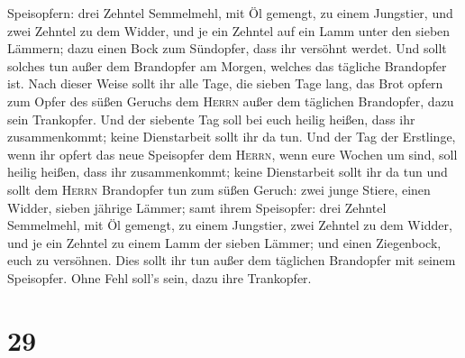 Speisopfern: drei Zehntel Semmelmehl, mit Öl gemengt, zu einem
Jungstier, und zwei Zehntel zu dem Widder,  und je ein
Zehntel auf ein Lamm unter den sieben Lämmern;  dazu
einen Bock zum Sündopfer, dass ihr versöhnt werdet.  Und
sollt solches tun außer dem Brandopfer am Morgen, welches das tägliche
Brandopfer ist.  Nach dieser Weise sollt ihr alle Tage,
die sieben Tage lang, das Brot opfern zum Opfer des süßen Geruchs dem
\textsc{Herrn} außer dem täglichen Brandopfer, dazu sein Trankopfer.
 Und der siebente Tag soll bei euch heilig heißen, dass
ihr zusammenkommt; keine Dienstarbeit sollt ihr da tun. 
Und der Tag der Erstlinge, wenn ihr opfert das neue Speisopfer dem
\textsc{Herrn}, wenn eure Wochen um sind, soll heilig heißen, dass ihr
zusammenkommt; keine Dienstarbeit sollt ihr da tun  und
sollt dem \textsc{Herrn} Brandopfer tun zum süßen Geruch: zwei junge
Stiere, einen Widder, sieben jährige Lämmer;  samt ihrem
Speisopfer: drei Zehntel Semmelmehl, mit Öl gemengt, zu einem Jungstier,
zwei Zehntel zu dem Widder,  und je ein Zehntel zu einem
Lamm der sieben Lämmer;  und einen Ziegenbock, euch zu
versöhnen.  Dies sollt ihr tun außer dem täglichen
Brandopfer mit seinem Speisopfer. Ohne Fehl soll's sein, dazu ihre
Trankopfer.

\hypertarget{section-28}{%
\section{29}\label{section-28}}

